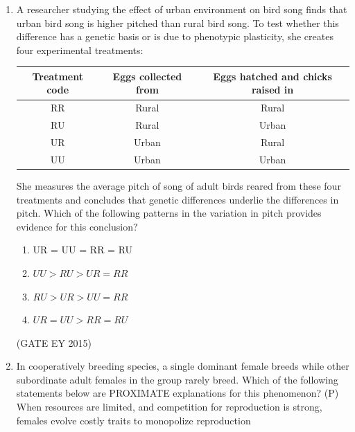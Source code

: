 \documentclass[journal,12pt,onecolumn]{IEEEtran}
\theoremstyle{remark}
\begin{document}
\begin{enumerate}
\begin{multicols}{4}
\begin{enumerate}
    
\item 3:2:1
\item 2:2:1
\item 1:2:1
\item 1:1:1

    \end{enumerate}
    \end{multicols}
\hfill{(GATE EY 2015)}

\item 
A researcher studying the effect of urban environment on bird song finds that urban bird song is higher pitched than rural bird song. To test whether this difference has a genetic basis or is due to phenotypic plasticity, she creates four experimental treatments:


\begin{tabular}{|c|c|c|}
\hline
\textbf{Treatment code} & \textbf{Eggs collected from} & \textbf{Eggs hatched and chicks raised in} \\ \hline
RR & Rural & Rural \\ \hline
RU & Rural & Urban \\ \hline
UR & Urban & Rural \\ \hline
UU & Urban & Urban \\ \hline
\end{tabular}



She measures the average pitch of song of adult birds reared from these four treatments and concludes that genetic differences underlie the differences in pitch. Which of the following patterns in the variation in pitch provides evidence for this conclusion?

\begin{multicols}{2}
\begin{enumerate}
    
\item UR = UU = RR = RU
\item$ UU > RU > UR = RR$
\item$ RU > UR > UU = RR$
\item $UR = UU > RR = RU$

    \end{enumerate}
    \end{multicols}
\hfill{(GATE EY 2015)}

\item 
In cooperatively breeding species, a single dominant female breeds while other subordinate adult females in the group rarely breed. Which of the following statements below are PROXIMATE explanations for this phenomenon?
(P) When resources are limited, and competition for reproduction is strong, females evolve costly traits to monopolize reproduction


\end{enumerate}
\end{document}
